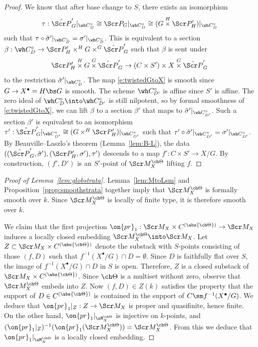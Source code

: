 \documentclass[final]{amsart}
\theoremstyle{remark}
\theoremstyle{definition}
\numberwithin{equation}{section}
\begin{document}
\begin{proof}
We know that after base change to $S$, there exists an isomorphism
\[ \tau : \hat{\Scr P}'_G|_{\wh C^\circ_D} \cong \Scr P_G|_{\wh C^\circ_D} \cong (G\overset H\times \Scr P'_H)|_{\wh C^\circ_D} \]
such that $\tau \circ \hat\sigma'|_{\wh C^\circ_D} = \sigma'|_{\wh C^\circ_D}$. This is equivalent to a section 
$\beta: \wh C^\circ_D \to 
\Scr P'_H\times^H G\times^G \hat{\Scr P}'_G$
such that $\beta$ is sent under 
\begin{equation} \label{e:twistedGtoX} 
    \Scr P'_H \overset H\times G \overset G\times \hat{\Scr P}'_G \to (C\times S')\times X \overset G\times \hat{\Scr P}'_G
\end{equation}
 to the restriction $\hat \sigma'|_{\wh C^\circ_{D}}$.
The map \eqref{e:twistedGtoX} is smooth since $G\to X^\bullet=H\bs G$ is smooth.
The scheme $\wh C^\circ_{D'}$ is affine since $S'$ is affine.
The zero ideal of $\wh C^\circ_D\into \wh C^\circ_{D'}$ is still
nilpotent, so by formal smoothness of \eqref{e:twistedGtoX}, we
can lift $\beta$ to a section $\beta'$ that maps to $\hat \sigma'|_{\wh C^\circ_{D'}}$.
Such a section $\beta'$ is equivalent to an isomorphism 
$\tau' : \hat{\Scr P}'_G|_{\wh C^\circ_{D'}} \cong (G\times^H \Scr P'_H)|_{\wh C^\circ_{D'}}$ such that $\tau' \circ \hat\sigma' |_{\wh C^\circ_{D'}} = \sigma'|_{\wh C^\circ_{D'}}$.
By Beauville--Laszlo's theorem (Lemma~\ref{lem:B-L}),
the data $((\hat{\Scr P}'_G,\hat\sigma'), (\Scr P'_H,\sigma'), \tau')$ descends to a map $f' : C\times S' \to X/G$. 
By construction, $(f',D')$ is an $S'$-point of $\Scr M^{\ch\Theta}_X$
lifting $f$.
\end{proof}


\begin{proof}[{Proof of Lemma~\ref{lem:globstrata}}] 
Lemma~\ref{lem:MtoLsm} and Proposition~\ref{prop:smoothstrata} together
imply that $\Scr M^{\ch\Theta}_X$ is formally smooth over $k$. 
Since $\Scr M^{\ch\Theta}_X$ is locally of finite type,
it is therefore smooth over $k$.

We claim that the first projection $\on{pr}_1 : \Scr M_X\times C^{(\abs{\ch\Theta})} \to \Scr M_X$ induces a locally closed
embedding $\Scr M^{\ch\Theta}_X \into \Scr M_X$. 
Let $Z \subset \Scr M_X \times C^{(\abs{\ch\Theta})}$ denote the substack
with $S$-points consisting of those $(f,D)$ such that 
$f^{-1}(X^\bullet/G)\cap D = \emptyset$. 
Since $D$ is faithfully flat over $S$, the image of $f^{-1}(X^\bullet/G)\cap D$ in $S$ is open. Therefore, $Z$
is a closed substack of $\Scr M_X \times C^{(\abs{\ch\Theta})}$.
Since $\ch\Theta$ is a multiset without zero, 
observe that $\Scr M^{\ch\Theta}_X$ embeds into 
$Z$. Now $(f,D)\in Z(k)$ satisfies the property that the support 
of $D\in C^{(\abs{\ch\Theta})}$ is contained in the support of $C \sm f^{-1}(X^\bullet/G)$. We deduce that ${\on{pr}_1}|_Z : Z \to \Scr M_X$ is 
proper and quasifinite, hence finite. 
On the other hand, $\on{pr}_1|_{\sM^{\ch\Theta}_X}$ is injective
on $k$-points, and 
$({\on{pr}_1}|_Z)^{-1}(\on{pr}_1(\Scr M^{\ch\Theta}_X)) = \Scr M^{\ch\Theta}_X$. 
From this we deduce that $\on{pr}_1|_{\sM^{\ch\Theta}_X}$ 
is a locally closed embedding.
\end{proof}
\end{document}
